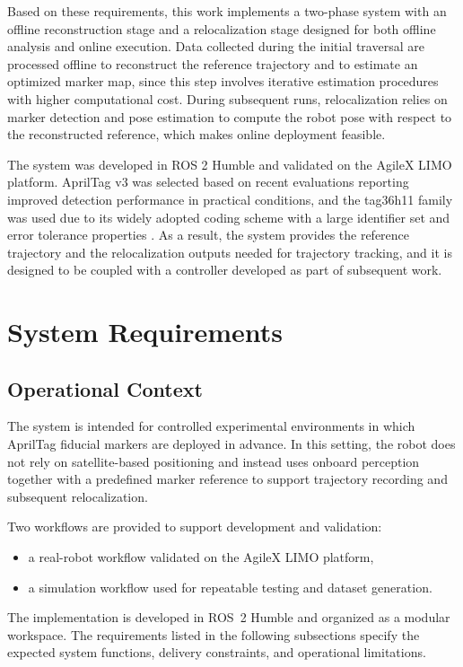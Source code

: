 \documentclass[a4paper,11pt]{article}
\begin{document}
	Based on these requirements, this work implements a two-phase system with an offline reconstruction stage and a relocalization stage designed for both offline analysis and online execution. Data collected during the initial traversal are processed offline to reconstruct the reference trajectory and to estimate an optimized marker map, since this step involves iterative estimation procedures with higher computational cost. During subsequent runs, relocalization relies on marker detection and pose estimation to compute the robot pose with respect to the reconstructed reference, which makes online deployment feasible. 
	
	The system was developed in ROS 2 Humble and validated on the AgileX LIMO platform. AprilTag v3 was selected based on recent evaluations reporting improved detection performance in practical conditions, and the tag36h11 family was used due to its widely adopted coding scheme with a large identifier set and error tolerance properties \cite{olson2011apriltag,krogius2019flexible}. As a result, the system provides the reference trajectory and the relocalization outputs needed for trajectory tracking, and it is designed to be coupled with a controller developed as part of subsequent work.
		
	
\section{System Requirements}

\subsection{Operational Context}

The system is intended for controlled experimental environments in which AprilTag fiducial markers are deployed in advance. In this setting, the robot does not rely on satellite-based positioning and instead uses onboard perception together with a predefined marker reference to support trajectory recording and subsequent relocalization.

Two workflows are provided to support development and validation:
\begin{itemize}
	\item a real-robot workflow validated on the AgileX LIMO platform,
	\item a simulation workflow used for repeatable testing and dataset generation.
\end{itemize}

The implementation is developed in ROS~2 Humble and organized as a modular workspace. The requirements listed in the following subsections specify the expected system functions, delivery constraints, and operational limitations.
\end{document}
